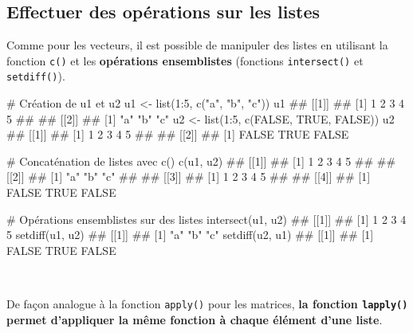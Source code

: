 \documentclass[12pt,twosided, notitlepage]{book}
\newenvironment{Shaded}{}{}
\newcommand{\KeywordTok}[1]{\textcolor[rgb]{0.00,0.00,1.00}{{#1}}}
\newcommand{\DecValTok}[1]{{#1}}
\newcommand{\StringTok}[1]{\textcolor[rgb]{0.00,0.50,0.50}{{#1}}}
\newcommand{\CommentTok}[1]{\textcolor[rgb]{0.00,0.50,0.00}{{#1}}}
\newcommand{\OtherTok}[1]{\textcolor[rgb]{1.00,0.25,0.00}{{#1}}}
\newcommand{\NormalTok}[1]{{#1}}
\renewenvironment{Shaded}{\begin{snugshade}}{\end{snugshade}}
\begin{document}
\subsection{Effectuer des opérations sur les
listes}\label{effectuer-des-operations-sur-les-listes}

Comme pour les vecteurs, il est possible de manipuler des listes en
utilisant la fonction \texttt{c()} et les
\textbf{opérations ensemblistes} (fonctions
\texttt{intersect()} et
\texttt{setdiff()}).

\begin{Shaded}
\begin{Highlighting}[]
\CommentTok{# Création de u1 et u2}
\NormalTok{u1 <-}\StringTok{ }\KeywordTok{list}\NormalTok{(}\DecValTok{1}\NormalTok{:}\DecValTok{5}\NormalTok{, }\KeywordTok{c}\NormalTok{(}\StringTok{"a"}\NormalTok{, }\StringTok{"b"}\NormalTok{, }\StringTok{"c"}\NormalTok{))}
\NormalTok{u1}
  \NormalTok{## [[1]]}
  \NormalTok{## [1] 1 2 3 4 5}
  \NormalTok{## }
  \NormalTok{## [[2]]}
  \NormalTok{## [1] "a" "b" "c"}
\NormalTok{u2 <-}\StringTok{ }\KeywordTok{list}\NormalTok{(}\DecValTok{1}\NormalTok{:}\DecValTok{5}\NormalTok{, }\KeywordTok{c}\NormalTok{(}\OtherTok{FALSE}\NormalTok{, }\OtherTok{TRUE}\NormalTok{, }\OtherTok{FALSE}\NormalTok{))}
\NormalTok{u2}
  \NormalTok{## [[1]]}
  \NormalTok{## [1] 1 2 3 4 5}
  \NormalTok{## }
  \NormalTok{## [[2]]}
  \NormalTok{## [1] FALSE  TRUE FALSE}

\CommentTok{# Concaténation de listes avec c()}
\KeywordTok{c}\NormalTok{(u1, u2)}
  \NormalTok{## [[1]]}
  \NormalTok{## [1] 1 2 3 4 5}
  \NormalTok{## }
  \NormalTok{## [[2]]}
  \NormalTok{## [1] "a" "b" "c"}
  \NormalTok{## }
  \NormalTok{## [[3]]}
  \NormalTok{## [1] 1 2 3 4 5}
  \NormalTok{## }
  \NormalTok{## [[4]]}
  \NormalTok{## [1] FALSE  TRUE FALSE}

\CommentTok{# Opérations ensemblistes sur des listes}
\KeywordTok{intersect}\NormalTok{(u1, u2)}
  \NormalTok{## [[1]]}
  \NormalTok{## [1] 1 2 3 4 5}
\KeywordTok{setdiff}\NormalTok{(u1, u2)}
  \NormalTok{## [[1]]}
  \NormalTok{## [1] "a" "b" "c"}
\KeywordTok{setdiff}\NormalTok{(u2, u1)}
  \NormalTok{## [[1]]}
  \NormalTok{## [1] FALSE  TRUE FALSE}
\end{Highlighting}
\end{Shaded}

~

De façon analogue à la fonction \texttt{apply()} pour les matrices,
\textbf{la fonction \texttt{lapply()} permet d'appliquer la même
fonction à chaque élément d'une liste}.
\end{document}
